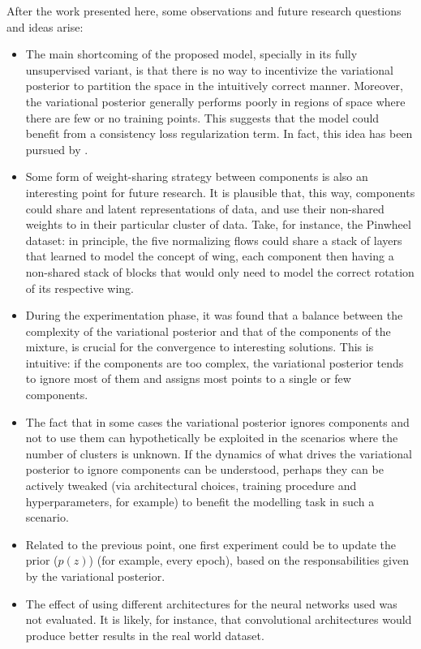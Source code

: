 After the work presented here, some observations and future research questions
and ideas arise:
\begin{itemize}
    \item The main shortcoming of the proposed model, specially in its fully
    unsupervised variant, is that there is no way to incentivize the variational
    posterior to partition the space in the intuitively correct manner. Moreover, the
    variational posterior generally performs poorly in regions of space where there are few
    or no training points. This suggests that the model could benefit from a consistency
    loss regularization term. In fact, this idea has been pursued by \textcite{semisuplearning_nflows}.
    \item Some form of weight-sharing strategy between components is also an interesting
    point for future research. It is plausible that, this way, components could
    share  and latent representations of data, and use their non-shared
    weights to  in their particular cluster of data. Take,
    for instance, the Pinwheel dataset: in principle, the five normalizing flows
    could share a stack of layers that learned to model the concept of wing,
    each component then having a non-shared stack of blocks that would only
    need to model the correct rotation of its respective wing.
    \item During the experimentation phase, it was found that a balance between
    the complexity of the variational posterior and that of the components of
    the mixture, is crucial for the convergence to interesting solutions. This
    is intuitive: if the components are too complex, the variational posterior
    tends to ignore most of them and assigns most points to a single or few components.
    \item The fact that in some cases the variational posterior ignores components
    and  not to use them can hypothetically be exploited in the scenarios
    where the number of clusters is unknown. If the dynamics of what drives the
    variational posterior to ignore components can be understood, perhaps they
    can be actively tweaked (via architectural choices, training procedure and
    hyperparameters, for example) to benefit the modelling task in such a scenario.
    \item Related to the previous point, one first experiment could be to update
    the prior ($p(z)$) (for example, every epoch), based on the responsabilities
    given by the variational posterior.
    \item The effect of using different architectures for the neural networks used
    was not evaluated. It is likely, for instance, that convolutional architectures
    would produce better results in the real world dataset.
\end{itemize}

